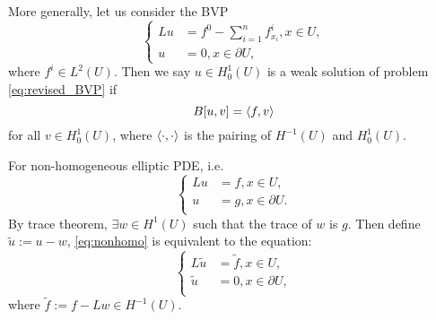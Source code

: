 More generally, let us consider the BVP 
\begin{equation}
    \label{eq:revised_BVP}
    \left\{
        \begin{aligned}
            Lu&=f^{0}-\sum_{i=1}^{n}f_{x_{i}}^{i},x\in U,\\
            u&=0,x\in\partial U,
        \end{aligned}
    \right.
\end{equation}
where $f^{i}\in L^{2}(U)$. Then we say $u\in H_{0}^{1}(U)$ is a weak solution of problem \eqref{eq:revised_BVP} if 
\begin{equation}
    B[u,v]=\left<f,v\right>
\end{equation}
for all $v\in H_{0}^{1}(U)$, where $\left<\cdot,\cdot\right>$ is the pairing of $H^{-1}(U)$ and $H_{0}^{1}(U)$.

For non-homogeneous elliptic PDE, i.e.
\begin{equation}
    \label{eq:nonhomo}
    \left\{
        \begin{aligned}
            Lu&=f,x\in U,\\
            u&=g,x\in \partial U.\\
        \end{aligned}
    \right.
\end{equation}
By trace theorem, $\exists w\in H^{1}(U)$ such that the trace of $w$ is $g$. Then define $\tilde{u}:=u-w$, \eqref{eq:nonhomo} is equivalent to the equation:
\begin{equation}
    \label{eq:change_to_homogeneous}
    \left\{
        \begin{aligned}
            L\tilde{u}&=\tilde{f},x\in U,\\
            \tilde{u}&=0,x\in\partial U,\\
        \end{aligned}
    \right.
\end{equation}
where $\tilde{f}:=f-Lw\in H^{-1}(U)$.
